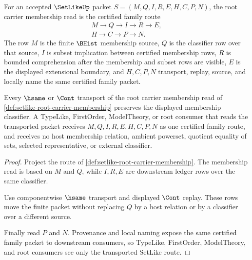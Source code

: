 \begin{definition}\label{def:setlike-root-carrier-membership}
For an accepted $\SetLikeUp$ packet $S=(M,Q,I,R,E,H,C,P,N)$, the root carrier membership read is the certified family route
$$
\begin{gathered}
M \longrightarrow Q \longrightarrow I \longrightarrow R \longrightarrow E,\\
H \longrightarrow C \longrightarrow P \longrightarrow N .
\end{gathered}
$$
The row $M$ is the finite $\BHist$ membership source, $Q$ is the classifier row over that source, $I$ is subset implication between certified membership rows, $R$ is bounded comprehension after the membership and subset rows are visible, $E$ is the displayed extensional boundary, and $H,C,P,N$ transport, replay, source, and locally name the same certified family packet.
\end{definition}

\begin{theorem}\label{thm:setlike-root-classifier-transport}
Every $\hsame$ or $\Cont$ transport of the root carrier membership read of \autoref{def:setlike-root-carrier-membership} preserves the displayed membership classifier. A TypeLike, FirstOrder, ModelTheory, or root consumer that reads the transported packet receives $M,Q,I,R,E,H,C,P,N$ as one certified family route, and receives no host membership relation, ambient powerset, quotient equality of sets, selected representative, or external classifier.
\end{theorem}
\begin{proof}
Project the route of \autoref{def:setlike-root-carrier-membership}. The membership read is based on $M$ and $Q$, while $I,R,E$ are downstream ledger rows over the same classifier.

Use componentwise $\hsame$ transport and displayed $\Cont$ replay. These rows move the finite packet without replacing $Q$ by a host relation or by a classifier over a different source.

Finally read $P$ and $N$. Provenance and local naming expose the same certified family packet to downstream consumers, so TypeLike, FirstOrder, ModelTheory, and root consumers see only the transported SetLike route.
\end{proof}

